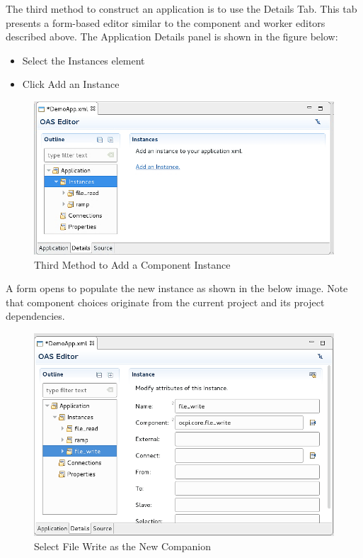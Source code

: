 \documentclass[10pt, a4paper, oneside]{article}
\begin{document}
The third method to construct an application is to use the Details Tab. This tab presents a form-based editor similar to the component and worker editors described above. The Application Details panel is shown in the figure below:\\

\begin{itemize}
\item	Select the Instances element
\item	Click Add an Instance
\end{itemize}
\begin{figure}[h!]
	\centering
	\caption{Third Method to Add a Component Instance}{}
	\includegraphics[width=.95\textwidth]{ThirdMethodtoAddaComponentInstance.png}
 \end{figure}
A form opens to populate the new instance as shown in the below image. Note that component choices originate from the current project and its project dependencies.\\
\begin{figure}[h!]
	\centering
	\caption{Select File Write as the New Companion}{}
	\includegraphics[width=.95\textwidth]{SelectFileWriteastheNewCompanion.png}
 \end{figure}
\end{document}
